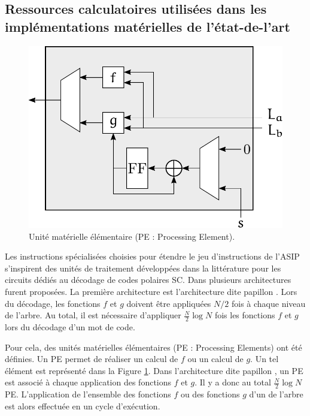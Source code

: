 \subsection{Ressources calculatoires utilisées dans les implémentations matérielles de l'état-de-l'art}
\label{subsec:hard_sc}

\begin{figure}[t]
\centering
\includegraphics[scale=0.75]{main/ch3_fig/PE}
\caption{Unité matérielle élémentaire (PE : Processing Element).}
\label{fig:pe}
\end{figure}


Les instructions spécialisées choisies pour étendre le jeu d'instructions de l'ASIP s'inspirent des unités de traitement développées dans la littérature pour les circuits dédiés au décodage de codes polaires SC. Dans \cite{leroux_hardware_2011} plusieurs architectures furent proposées. La première architecture est l'architecture dite \og papillon \fg. Lors du décodage, les fonctions $f$ et $g$ doivent être appliquées $N/2$ fois à chaque niveau de l'arbre. Au total, il est nécessaire d'appliquer $\frac{N}{2} \log N$ fois les fonctions $f$ et $g$ lors du décodage d'un mot de code. 

Pour cela, des unités matérielles élémentaires (PE : Processing Elements) ont été définies.
Un PE permet de réaliser un calcul de $f$ ou un calcul de $g$. Un tel élément est représenté dans la Figure \ref{fig:pe}.
Dans l'architecture dite \og papillon \fg, un PE est associé à chaque application des fonctions $f$ et $g$.
Il y a donc au total $\frac{N}{2} \log N$ PE.
L'application de l'ensemble des fonctions $f$ ou des fonctions $g$ d'un \noeud de l'arbre est alors effectuée en un cycle d'exécution.

